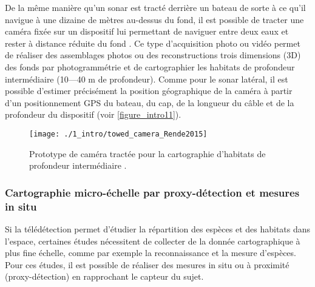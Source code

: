De la même manière qu’un sonar est tracté derrière un bateau de sorte à ce qu’il navigue à une dizaine de mètres au-dessus du fond, il est possible de tracter une caméra fixée sur un dispositif lui permettant de naviguer entre deux eaux et rester à distance réduite du fond \citep{rende_advances_2015}. Ce type d’acquisition photo ou vidéo permet de réaliser des assemblages photos ou des reconstructions trois dimensions (3D) des fonds par photogrammétrie et de cartographier les habitats de profondeur intermédiaire (10---40 m de profondeur). Comme pour le sonar latéral, il est possible d’estimer précisément la position géographique de la caméra à partir d’un positionnement GPS du bateau, du cap, de la longueur du câble et de la profondeur du dispositif (voir \autoref{figure_intro11}).

\begin{figure}[H]
	\begin{center}
	\texttt{[image: ./1\_intro/towed\_camera\_Rende2015]}
		\caption[Prototype de caméra tractée pour la cartographie d’habitats de profondeur intermédiaire]{Prototype de caméra tractée pour la cartographie d’habitats de profondeur intermédiaire \citep{rende_advances_2015}.}
	\label{figure_intro11}
\end{center}
\end{figure}

\setlength{\fboxsep}{3pt}
\setlength{\fboxrule}{0.6pt}
\noindent{}

\subsubsection{Cartographie micro-échelle par proxy-détection et mesures in situ}\label{intro.2.2.2}

Si la télédétection permet d’étudier la répartition des espèces et des habitats dans l’espace, certaines études nécessitent de collecter de la donnée cartographique à plus fine échelle, comme par exemple la reconnaissance et la mesure d’espèces. Pour ces études, il est possible de réaliser des mesures in situ ou à proximité (proxy-détection) en rapprochant le capteur du sujet.


